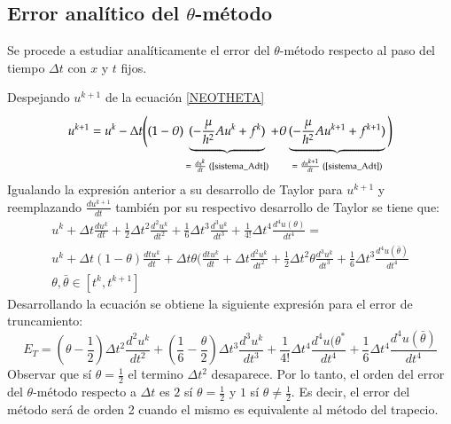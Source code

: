 \documentclass{endm}
\begin{document}
\subsection{Error analítico del \texorpdfstring{$\theta$-método}{Theta-metodo}} \label{Errortheta}

Se procede a estudiar analíticamente el error del $\theta$-método respecto al paso del tiempo $\Delta t$ con $x$ y $t$ fijos.

Despejando $u^{k+1}$ de la ecuación \ref{NEOTHETA}
\begin{equation}
    u^{k+1} = u^k - \Delta t\Bigg( (1-\theta)\underbrace{(-\frac{\mu}{h^2} A u^k + f^k)}_{\text{$=\frac{du^k}{dt}$ (\ref{sistema_Adt})}} + \theta \underbrace{(-\frac{\mu}{h^2} A u^{k+1}+f^{k+1})}_{\text{$=\frac{du^{k+1}}{dt}$ (\ref{sistema_Adt})}}\Bigg)
\end{equation}
Igualando la expresión anterior a su desarrollo de Taylor para $u^{k+1}$ y reemplazando $\frac{du^{k+1}}{dt}$ también por su respectivo desarrollo de Taylor se tiene que:
\begin{multline*}
    u^k+\Delta t \frac{du^k}{dt}+\frac{1}{2}\Delta t^2 \frac{d^2 u^k}{dt^2}+\frac{1}{6}\Delta t^3 \frac{d^3 u^k}{dt^3} + \frac{1}{4!}\Delta t^4 \frac{d^4 u(\theta)}{dt^4} = \\
    u^k+\Delta t (1-\theta) \frac{dt u^k}{dt}+ \Delta t \theta ( \frac{dt u^k}{dt}+ \Delta t \frac{d^2 u^k}{dt^2}+ \frac{1}{2} \Delta t^2 \theta \frac{d^3 u^k}{dt^3} + \frac{1}{6} \Delta t^3 \frac{d^4 u(\bar{\theta})}{dt^4}\\
    \theta,\bar{\theta} \in [t^k,t^{k+1}]
\end{multline*}
Desarrollando la ecuación se obtiene la siguiente expresión para el error de truncamiento:
\begin{equation}
    E_T = (\theta - \frac{1}{2})\Delta t^2 \frac{d^2 u^k}{dt^2}+ (\frac{1}{6}-\frac{\theta}{2})\Delta t^3 \frac{d^3 u^k}{dt^3}+\frac{1}{4!}\Delta t^4 \frac{d^4 u(\theta^*}{dt^4} +  \frac{1}{6}\Delta t^4 \frac{d^4 u(\bar{\theta})}{dt^4}
\end{equation}
Observar que sí $\theta = \frac{1}{2}$ el termino $\Delta t^2$ desaparece. Por lo tanto, el orden del error del  $\theta$-método respecto a $\Delta t$ es $2$ sí $\theta = \frac{1}{2}$ y $1$ sí $\theta \neq \frac{1}{2}$. Es decir, el error del método será de orden 2 cuando el mismo es equivalente al método del trapecio. 
\end{document}
